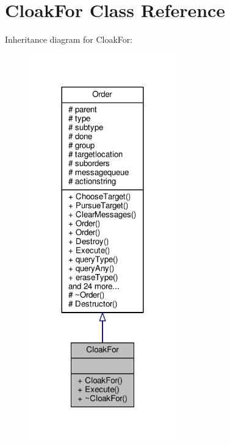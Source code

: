 \hypertarget{classCloakFor}{}\section{Cloak\+For Class Reference}
\label{classCloakFor}


Inheritance diagram for Cloak\+For\+:
\nopagebreak
\begin{figure}[H]
\begin{center}
\leavevmode
\includegraphics[width=180pt]{d9/d4b/classCloakFor__inherit__graph}
\end{center}
\end{figure}


